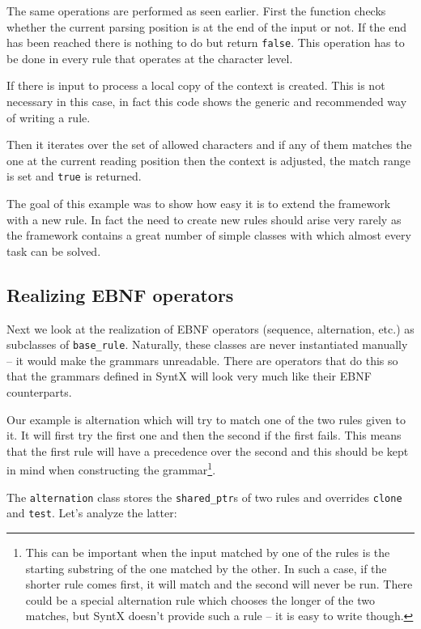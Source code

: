 \documentclass[12pt]{article}
\newcommand{\usubsec}[2]{\subsection*{#1}\label{subsec:#2}\addcontentsline{toc}{subsection}{#1}}
\begin{document}
The same operations are performed as seen earlier. First the function checks whether the current parsing
position is at the end of the input or not. If the end has been reached there is nothing to do but return
\texttt{false}. This operation has to be done in every rule that operates at the character level.

If there is input to process a local copy of the context is created. This is not necessary in this case, in
fact this code shows the generic and recommended way of writing a rule.

Then it iterates over the set of allowed characters and if any of them matches the one at the current reading
position then the context is adjusted, the match range is set and \texttt{true} is returned.

The goal of this example was to show how easy it is to extend the framework with a new rule. In fact the
need to create new rules should arise very rarely as the framework contains a great number of simple classes
with which almost every task can be solved.

\usubsec{Realizing EBNF operators}{ebnfoperators}
Next we look at the realization of EBNF operators (sequence, alternation, etc.) as subclasses of
\texttt{base\_rule}. Naturally, these classes are never instantiated manually -- it would make the grammars
unreadable. There are operators that do this so that the grammars defined in SyntX will look very much like
their EBNF counterparts.

Our example is alternation which will try to match one of the two rules given to it. It will first try the
first one and then the second if the first fails. This means that the first rule will have a precedence over
the second and this should be kept in mind when constructing the grammar\footnote{This can be important when
the input matched by one of the rules is the starting substring of the one matched by the other. In such a
case, if the shorter rule comes first, it will match and the second will never be run. There could be a special
alternation rule which chooses the longer of the two matches, but SyntX doesn't provide such a rule -- it is easy to
write though.}.

The \texttt{alternation} class stores the \texttt{shared\_ptr}s of two rules and overrides \texttt{clone} and
\texttt{test}. Let's analyze the latter:
\end{document}
